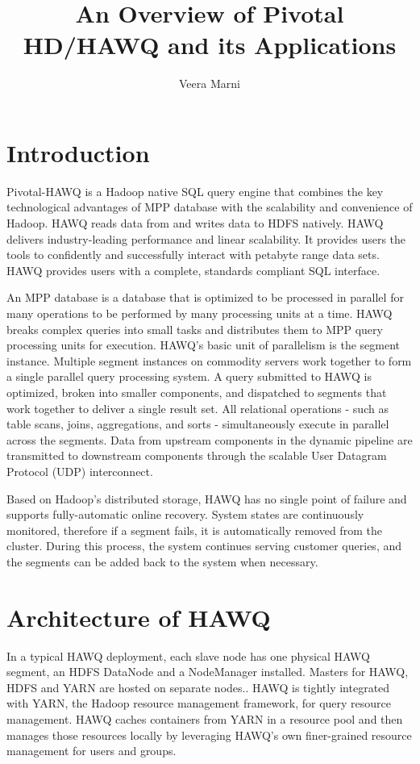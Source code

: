 \documentclass[9pt,twocolumn,twoside]{styles/osajnl}
\title{An Overview of Pivotal HD/HAWQ and its Applications}
\author[1]{Veera Marni}
\affil[1]{School of Informatics and Computing, Bloomington, IN 47408, U.S.A.}
\affil[*]{Corresponding authors: vmarni@umail.iu.edu}
\begin{document}
\maketitle

\section{Introduction} 

{Pivotal-HAWQ}\cite{www-about-hawq} is a Hadoop native SQL query 
engine that 
combines the key technological advantages of MPP database with the 
scalability and convenience of Hadoop. HAWQ reads data from and 
writes data to HDFS natively. HAWQ delivers industry-leading 
performance and linear scalability. It provides users the tools to 
confidently and successfully interact with petabyte range data sets. 
HAWQ provides users with a complete, standards compliant SQL 
interface.

{An MPP database is a database that is optimized to be processed in 
parallel for many operations to	be performed by many processing units 
at a time.}\cite{www-about-mpp} HAWQ breaks complex queries into 
small tasks and distributes them to MPP query processing units for 
execution. HAWQ’s basic unit of parallelism is the segment instance. 
Multiple segment instances on commodity servers work together to form 
a single parallel query processing system. A query submitted to HAWQ 
is optimized, broken into smaller components, and dispatched to 
segments that work together to deliver a single result set. All 
relational operations - such as table scans, joins, aggregations, and 
sorts - simultaneously execute in parallel across the segments. Data 
from upstream components in the dynamic pipeline are transmitted to 
downstream components through the scalable User Datagram Protocol 
(UDP) interconnect.

Based on Hadoop’s distributed storage, HAWQ has no single point of 
failure and supports fully-automatic online recovery. System states 
are continuously monitored, therefore if a segment fails, it is 
automatically removed from the cluster. During this process, the 
system continues serving customer queries, and the segments can be 
added back to the system when necessary.

\section{Architecture of HAWQ}

{In a typical HAWQ deployment, each slave node has one physical HAWQ 
segment, an HDFS DataNode and a NodeManager installed. Masters for 
HAWQ, HDFS and YARN are hosted on separate 
nodes.}\cite{www-hawq-architecture}. HAWQ is tightly integrated with 
YARN, the Hadoop resource management 
framework, for query resource management. HAWQ caches containers from 
YARN in a resource pool and then manages those resources locally by 
leveraging HAWQ’s own finer-grained resource management for users and 
groups.
\end{document}
